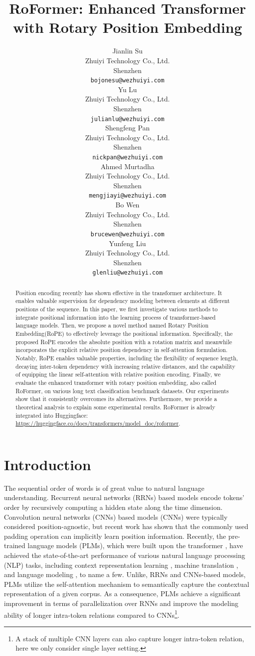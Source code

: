 \documentclass{article}
\title{RoFormer: Enhanced Transformer with Rotary Position Embedding}
\author{
	Jianlin Su \\
	Zhuiyi Technology Co., Ltd.\\
	Shenzhen \\
	\texttt{bojonesu@wezhuiyi.com} \\
	\And
	Yu Lu \\
	Zhuiyi Technology Co., Ltd.\\
	Shenzhen \\
	\texttt{julianlu@wezhuiyi.com} \\
	\And
	Shengfeng Pan \\
	Zhuiyi Technology Co., Ltd.\\
	Shenzhen \\
	\texttt{nickpan@wezhuiyi.com} \\
	\And
	Ahmed Murtadha \\
	Zhuiyi Technology Co., Ltd.\\
	Shenzhen \\
	\texttt{mengjiayi@wezhuiyi.com} \\
	\And
	Bo Wen \\
	Zhuiyi Technology Co., Ltd.\\
	Shenzhen \\
	\texttt{brucewen@wezhuiyi.com} \\
	\And
	Yunfeng Liu \\
	Zhuiyi Technology Co., Ltd.\\
	Shenzhen \\
	\texttt{glenliu@wezhuiyi.com} \\
}
\begin{document}
\maketitle

\begin{abstract}
	Position encoding recently has shown effective in the transformer architecture. It enables valuable supervision for dependency modeling between elements at different positions of the sequence. In this paper, we first investigate various methods to integrate positional information into the learning process of transformer-based language models. Then, we propose a novel method named Rotary Position Embedding(RoPE) to effectively leverage the positional information. Specifically, the proposed RoPE encodes the absolute position with a rotation matrix and meanwhile incorporates the explicit relative position dependency in self-attention formulation. Notably, RoPE enables valuable properties, including the flexibility of sequence length, decaying inter-token dependency with increasing relative distances, and the capability of equipping the linear self-attention with relative position encoding.
	Finally, we evaluate the enhanced transformer with rotary position embedding, also called RoFormer, on various long text classification benchmark datasets. Our experiments show that it consistently overcomes its alternatives. Furthermore, we provide a theoretical analysis to explain some experimental results. RoFormer is already integrated into Huggingface: \url{https://huggingface.co/docs/transformers/model_doc/roformer}.
\end{abstract}


\section{Introduction}
The sequential order of words is of great value to natural language understanding. Recurrent neural networks (RRNs) based models encode tokens' order by recursively computing a hidden state along the time dimension.  Convolution neural networks (CNNs) based models (CNNs) \cite{Gehring:2017} were typically considered position-agnostic, but recent work \cite{Islam2020HowMP} has shown that the commonly used padding operation can implicitly learn position information. 
Recently,  the pre-trained language models (PLMs), which were built upon the transformer \cite{Vaswani:2017}, have achieved the state-of-the-art performance of various natural language processing (NLP) tasks, including context representation learning \cite{Devlin2019BERTPO}, machine translation \cite{Vaswani:2017}, and language modeling \cite{Radford2019LanguageMA}, to name a few.  Unlike, RRNs and CNNs-based models, PLMs utilize the self-attention mechanism to semantically capture the contextual representation of a given corpus. As a consequence, PLMs achieve a significant improvement in terms of parallelization over RNNs and improve the modeling ability of longer intra-token relations compared to CNNs\footnote{A stack of multiple CNN layers can also capture longer intra-token relation, here we only consider single layer setting.}. 
\end{document}
